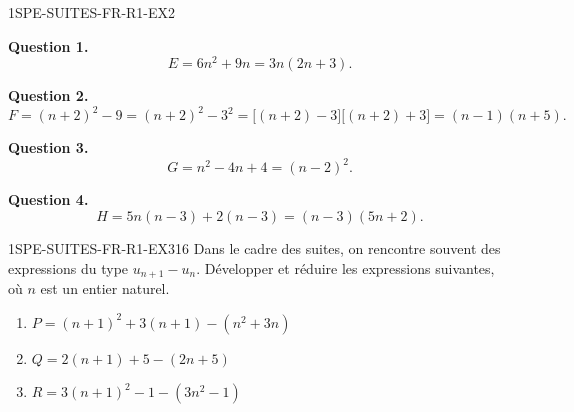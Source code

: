 \begin{corrige}{1SPE-SUITES-FR-R1-EX2}


\textbf{Question 1.}
\[
E = 6n^2 + 9n = 3n(2n + 3).
\]


\textbf{Question 2.}
\[
F = (n+2)^2 - 9 = (n+2)^2 - 3^2 = \bigl[(n+2)-3\bigr]\bigl[(n+2)+3\bigr] = (n-1)(n+5).
\]


\textbf{Question 3.}
\[
G = n^2 - 4n + 4 = (n-2)^2.
\]


\textbf{Question 4.}
\[
H = 5n(n-3) + 2(n-3) = (n-3)(5n+2).
\]

\end{corrige}


\begin{exercice}{1SPE-SUITES-FR-R1-EX3}{1}{6}
Dans le cadre des suites, on rencontre souvent des expressions du type $u_{n+1} - u_n$. Développer et réduire les expressions suivantes, où $n$ est un entier naturel.
\begin{enumerate}
  \item $P = (n+1)^2 + 3(n+1) - (n^2 + 3n)$
  \item $Q = 2(n+1) + 5 - (2n + 5)$
  \item $R = 3(n+1)^2 - 1 - (3n^2 - 1)$
\end{enumerate}
\end{exercice}


